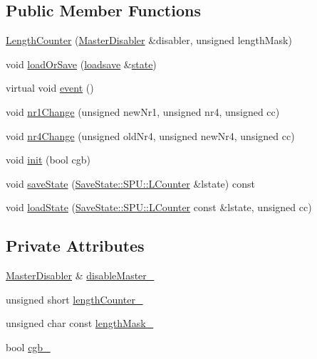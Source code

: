 \subsection*{Public Member Functions}
\begin{DoxyCompactItemize}
\item 
\hyperlink{classgambatte_1_1LengthCounter_aa654f8aecadd8f7f6c1896cc0fa23592}{Length\+Counter} (\hyperlink{classgambatte_1_1MasterDisabler}{Master\+Disabler} \&disabler, unsigned length\+Mask)
\item 
void \hyperlink{classgambatte_1_1LengthCounter_ad766b7f12bd30af4222cc9da435982b4}{load\+Or\+Save} (\hyperlink{classgambatte_1_1loadsave}{loadsave} \&\hyperlink{ppu_8cpp_a2f2eca6997ee7baf8901725ae074d45b}{state})
\item 
virtual void \hyperlink{classgambatte_1_1LengthCounter_ab0d3eda374d487f8a0b79ea447cca91a}{event} ()
\item 
void \hyperlink{classgambatte_1_1LengthCounter_a6b639f057dab0919908784e350b80228}{nr1\+Change} (unsigned new\+Nr1, unsigned nr4, unsigned cc)
\item 
void \hyperlink{classgambatte_1_1LengthCounter_a30e1eb09f738c51a75fa5ddd8bf41457}{nr4\+Change} (unsigned old\+Nr4, unsigned new\+Nr4, unsigned cc)
\item 
void \hyperlink{classgambatte_1_1LengthCounter_aa04df35be4639e81df42171dce3d1934}{init} (bool cgb)
\item 
void \hyperlink{classgambatte_1_1LengthCounter_a161626ce1c41fe0dc53dfdb40f5644ce}{save\+State} (\hyperlink{structgambatte_1_1SaveState_1_1SPU_1_1LCounter}{Save\+State\+::\+S\+P\+U\+::\+L\+Counter} \&lstate) const
\item 
void \hyperlink{classgambatte_1_1LengthCounter_ae49c50bda45d0d4056f31a3968294930}{load\+State} (\hyperlink{structgambatte_1_1SaveState_1_1SPU_1_1LCounter}{Save\+State\+::\+S\+P\+U\+::\+L\+Counter} const \&lstate, unsigned cc)
\end{DoxyCompactItemize}
\subsection*{Private Attributes}
\begin{DoxyCompactItemize}
\item 
\hyperlink{classgambatte_1_1MasterDisabler}{Master\+Disabler} \& \hyperlink{classgambatte_1_1LengthCounter_acad0b5c512a481252e37952e6a98888b}{disable\+Master\+\_\+}
\item 
unsigned short \hyperlink{classgambatte_1_1LengthCounter_abe18ec36f5b6989a094f681b7fb43a10}{length\+Counter\+\_\+}
\item 
unsigned char const \hyperlink{classgambatte_1_1LengthCounter_a48c36b01e764cde4ff589c1618422475}{length\+Mask\+\_\+}
\item 
bool \hyperlink{classgambatte_1_1LengthCounter_af5baee85c0c722bc5a192f1200969f70}{cgb\+\_\+}
\end{DoxyCompactItemize}
